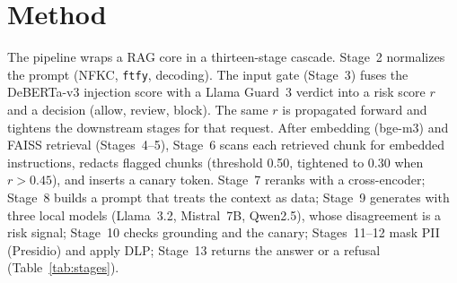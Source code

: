 \documentclass[conference,a4paper]{IEEEtran}
\begin{document}
\section{Method}\label{sec:method}
The pipeline wraps a RAG core in a thirteen-stage cascade. Stage~2 normalizes the prompt (NFKC, \texttt{ftfy}, decoding). The input gate (Stage~3) fuses the DeBERTa-v3 injection score with a Llama Guard~3 verdict into a risk score $r$ and a decision (allow, review, block). The same $r$ is propagated forward and tightens the downstream stages for that request. After embedding (bge-m3) and FAISS retrieval (Stages~4--5), Stage~6 scans each retrieved chunk for embedded instructions, redacts flagged chunks (threshold 0.50, tightened to 0.30 when $r>0.45$), and inserts a canary token. Stage~7 reranks with a cross-encoder; Stage~8 builds a prompt that treats the context as data; Stage~9 generates with three local models (Llama~3.2, Mistral~7B, Qwen2.5), whose disagreement is a risk signal; Stage~10 checks grounding and the canary; Stages~11--12 mask PII (Presidio) and apply DLP; Stage~13 returns the answer or a refusal (Table~\ref{tab:stages}).

\begin{table}[!h]
\centering
\caption{The cascade. Every model runs locally.}
\label{tab:stages}
\footnotesize
\setlength{\tabcolsep}{2pt}
\end{table}
\end{document}
